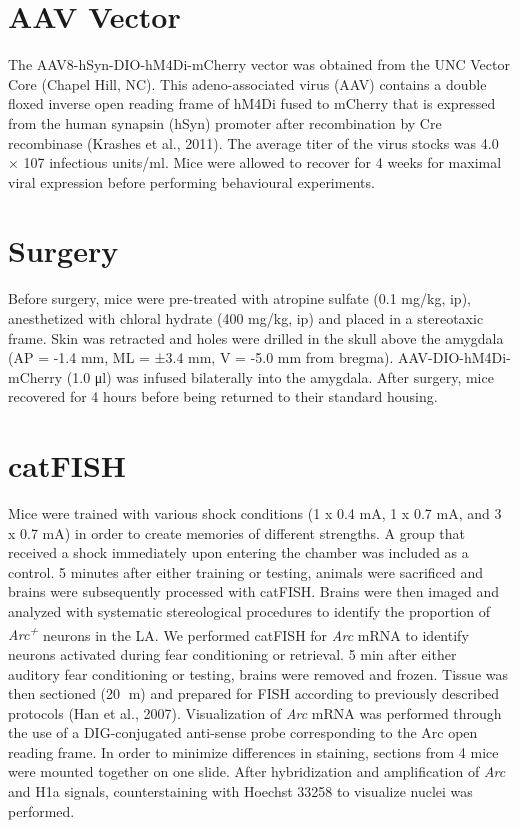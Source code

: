 \documentclass[12pt,a4paperpaper,]{report}
\begin{document}
\section{AAV Vector}\label{aav-vector}

The AAV8-hSyn-DIO-hM4Di-mCherry vector was obtained from the UNC Vector
Core (Chapel Hill, NC). This adeno-associated virus (AAV) contains a
double floxed inverse open reading frame of hM4Di fused to mCherry that
is expressed from the human synapsin (hSyn) promoter after recombination
by Cre recombinase (Krashes et al., 2011). The average titer of the
virus stocks was 4.0 × 107 infectious units/ml. Mice were allowed to
recover for 4 weeks for maximal viral expression before performing
behavioural experiments.

\section{Surgery}\label{surgery}

Before surgery, mice were pre-treated with atropine sulfate (0.1 mg/kg,
ip), anesthetized with chloral hydrate (400 mg/kg, ip) and placed in a
stereotaxic frame. Skin was retracted and holes were drilled in the
skull above the amygdala (AP = -1.4 mm, ML = ±3.4 mm, V = -5.0 mm from
bregma). AAV-DIO-hM4Di-mCherry (1.0 μl) was infused bilaterally into the
amygdala. After surgery, mice recovered for 4 hours before being
returned to their standard housing.

\section{catFISH}\label{catfish}

Mice were trained with various shock conditions (1 x 0.4 mA, 1 x 0.7 mA,
and 3 x 0.7 mA) in order to create memories of different strengths. A
group that received a shock immediately upon entering the chamber was
included as a control. 5 minutes after either training or testing,
animals were sacrificed and brains were subsequently processed with
catFISH. Brains were then imaged and analyzed with systematic
stereological procedures to identify the proportion of
\emph{Arc\textsuperscript{+}} neurons in the LA. We performed catFISH
for \emph{Arc} mRNA to identify neurons activated during fear
conditioning or retrieval. 5 min after either auditory fear conditioning
or testing, brains were removed and frozen. Tissue was then sectioned
(20 m) and prepared for FISH according to previously described
protocols (Han et al., 2007). Visualization of \emph{Arc} mRNA was
performed through the use of a DIG-conjugated anti-sense probe
corresponding to the Arc open reading frame. In order to minimize
differences in staining, sections from 4 mice were mounted together on
one slide. After hybridization and amplification of \emph{Arc} and H1a
signals, counterstaining with Hoechst 33258 to visualize nuclei was
performed.
\end{document}
